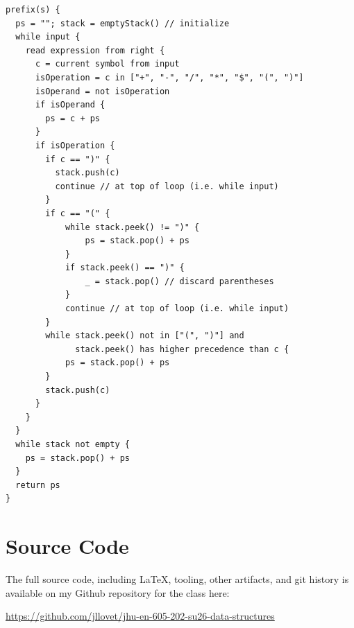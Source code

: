 \documentclass[12pt,letterpaper,final]{report}
\begin{document}
\pagebreak
\begin{mdframed}
\begin{verbatim}
prefix(s) {
  ps = ""; stack = emptyStack() // initialize
  while input {
    read expression from right {
      c = current symbol from input
      isOperation = c in ["+", "-", "/", "*", "$", "(", ")"]
      isOperand = not isOperation
      if isOperand {
        ps = c + ps
      }
      if isOperation {
        if c == ")" {
          stack.push(c)
          continue // at top of loop (i.e. while input)
        }
        if c == "(" {
            while stack.peek() != ")" {
                ps = stack.pop() + ps
            }
            if stack.peek() == ")" {
                _ = stack.pop() // discard parentheses
            }
            continue // at top of loop (i.e. while input)
        }
        while stack.peek() not in ["(", ")"] and
              stack.peek() has higher precedence than c {
            ps = stack.pop() + ps
        }
        stack.push(c)
      }
    }
  }
  while stack not empty {
    ps = stack.pop() + ps
  }
  return ps
}
\end{verbatim}
\end{mdframed}

\pagebreak

\section*{Source Code}
The full source code, including LaTeX, tooling, other artifacts, and git history is available on my Github repository for the class here:
\begin{center}
  \url{https://github.com/jllovet/jhu-en-605-202-su26-data-structures}
\end{center}

\printbibliography
\end{document}
